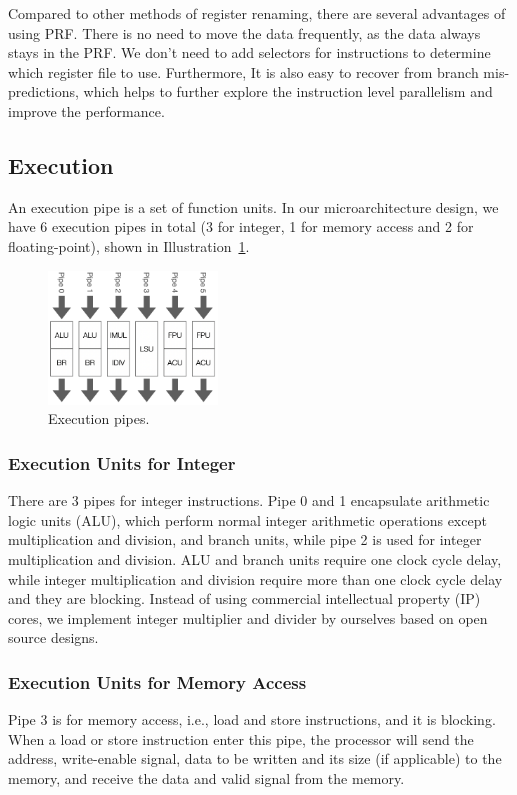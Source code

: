 Compared to other methods of register renaming, there are several advantages of using PRF. There is no need to move the data frequently, as the data always stays in the PRF. We don't need to add selectors for instructions to determine which register file to use. Furthermore, It is also easy to recover from branch mis-predictions, which helps to further explore the instruction level parallelism and improve the performance.

\subsection{Execution} %

An execution pipe is a set of function units. In our microarchitecture design, we have 6 execution pipes in total (3 for integer, 1 for memory access and 2 for floating-point), shown in Illustration~\ref{fig:pipe}.

\begin{figure}[!htp]
    \centering
    \includegraphics[width=0.4\textwidth]{figure/pipe.png}
    \caption{Execution pipes.}
    \label{fig:pipe}
\end{figure}

\subsubsection{Execution Units for Integer} %
There are 3 pipes for integer instructions. Pipe 0 and 1 encapsulate arithmetic logic units (ALU), which perform normal integer arithmetic operations except multiplication and division, and branch units, while pipe 2 is used for integer multiplication and division. ALU and branch units require one clock cycle delay, while integer multiplication and division require more than one clock cycle delay and they are blocking. Instead of using commercial intellectual property (IP) cores, we implement integer multiplier and divider by ourselves based on open source designs.

\subsubsection{Execution Units for Memory Access} %
Pipe 3 is for memory access, i.e., load and store instructions, and it is blocking. When a load or store instruction enter this pipe, the processor will send the address, write-enable signal, data to be written and its size (if applicable) to the memory, and receive the data and valid signal from the memory.


